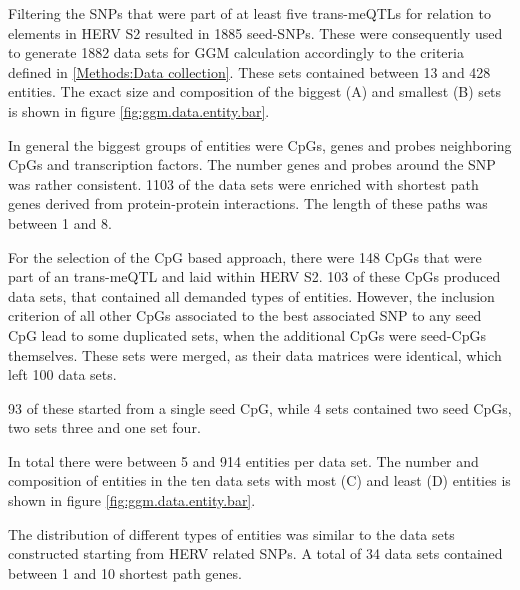 \documentclass[a4paper,12pt,twoside,openright]{article}
\begin{document}
Filtering the SNPs that were part of at least five trans-meQTLs for relation to elements in HERV S2 resulted in 1885 seed-SNPs. These were consequently used to generate 1882 data sets for GGM calculation accordingly to the criteria defined in \ref{Methods:Data collection}. These sets contained between 13 and 428 entities. The exact size and composition of the biggest (A) and smallest (B) sets is shown in figure \ref{fig:ggm.data.entity.bar}.

In general the biggest groups of entities were CpGs, genes and probes neighboring CpGs and transcription factors. The number genes and probes around the SNP was rather consistent. 1103 of the data sets were enriched with shortest path genes derived from protein-protein interactions. The length of these paths was between 1 and 8. 

For the selection of the CpG based approach, there were 148 CpGs that were part of an trans-meQTL and laid within HERV S2. 103 of these CpGs produced data sets, that contained all demanded types of entities. However, the inclusion criterion of all other CpGs associated to the best associated SNP to any seed CpG lead to some duplicated sets, when the additional CpGs were seed-CpGs themselves. These sets were merged, as their data matrices were identical, which left 100 data sets. 

93 of these started from a single seed CpG, while 4 sets contained two seed CpGs, two sets three and one set four. 

In total there were between 5 and 914 entities per data set. The number and composition of entities in the ten data sets with most (C) and least (D) entities is shown in figure \ref{fig:ggm.data.entity.bar}.

The distribution of different types of entities was similar to the data sets constructed starting from HERV related SNPs. A total of 34 data sets contained between 1 and 10 shortest path genes. 
\end{document}
